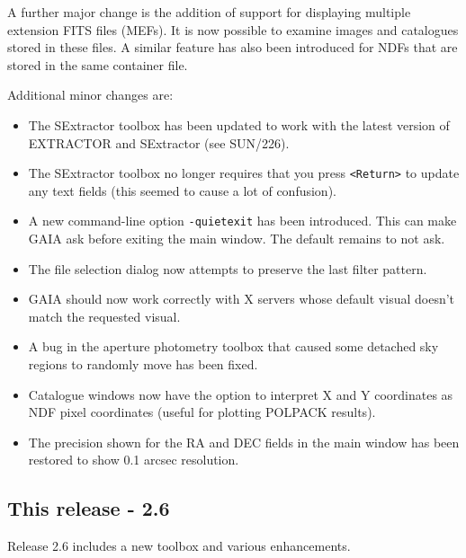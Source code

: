\documentclass[twoside,11pt]{article}
\newcommand{\xref}[3]{#1}
\renewcommand{\_}{\texttt{\symbol{95}}}
\newcommand{\mytt}[1]{{\texttt{#1}}}
\begin{document}
  A further major change is the addition of support for displaying
  multiple extension FITS files (MEFs). It is now possible to examine
  images and catalogues stored in these files. A similar feature has
  also been introduced for NDFs that are stored in the same container
  file.

  Additional minor changes are:
  \begin{itemize}

    \item The SExtractor toolbox has been updated to work with the
    latest version of EXTRACTOR and SExtractor (see
    \xref{SUN/226}{sun226}{}).

    \item The SExtractor toolbox no longer requires that you press
    \mytt{<Return>} to update any text fields (this seemed to cause a
    lot of confusion).

    \item A new command-line option \mytt{-quiet\_exit} has been
    introduced. This can make GAIA ask before exiting the main
    window. The default remains to not ask.

    \item The file selection dialog now attempts to preserve the last
    filter pattern.

    \item GAIA should now work correctly with X servers whose default
    visual doesn't match the requested visual.

    \item A bug in the aperture photometry toolbox that caused some
    detached sky regions to randomly move has been fixed.

    \item Catalogue windows now have the option to interpret X and Y
    coordinates as \xref{NDF}{sun33}{} \xref{pixel
    coordinates}{sun95}{se_pixgrd} (useful for plotting
    \xref{POLPACK}{sun223}{} results).

    \item The precision shown for the RA and DEC fields in the main
    window has been restored to show 0.1 arcsec resolution.
  \end{itemize}

\subsection{This release - 2.6} 
  Release 2.6 includes a new toolbox and various enhancements.
\end{document}
